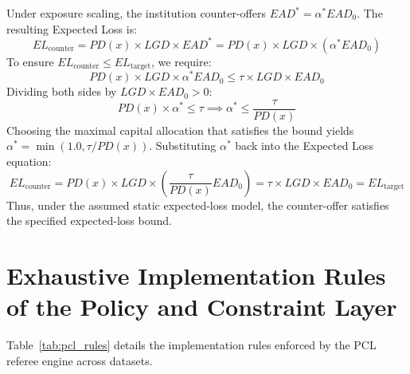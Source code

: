 \documentclass[manuscript,screen,review,anonymous]{acmart}
\begin{document}
Under exposure scaling, the institution counter-offers $EAD^* = \alpha^* EAD_0$. The resulting Expected Loss is:
\begin{equation}
EL_{\text{counter}} = PD(x) \times LGD \times EAD^* = PD(x) \times LGD \times (\alpha^* EAD_0)
\end{equation}
To ensure $EL_{\text{counter}} \le EL_{\text{target}}$, we require:
\begin{equation}
PD(x) \times LGD \times \alpha^* EAD_0 \le \tau \times LGD \times EAD_0
\end{equation}
Dividing both sides by $LGD \times EAD_0 > 0$:
\begin{equation}
PD(x) \times \alpha^* \le \tau \implies \alpha^* \le \frac{\tau}{PD(x)}
\end{equation}
Choosing the maximal capital allocation that satisfies the bound yields $\alpha^* = \min(1.0, \tau / PD(x))$. Substituting $\alpha^*$ back into the Expected Loss equation:
\begin{equation}
EL_{\text{counter}} = PD(x) \times LGD \times \left( \frac{\tau}{PD(x)} EAD_0 \right) = \tau \times LGD \times EAD_0 = EL_{\text{target}}
\end{equation}
Thus, under the assumed static expected-loss model, the counter-offer satisfies the specified expected-loss bound.

\section{Exhaustive Implementation Rules of the Policy and Constraint Layer}
\label{app:pcl_rules}
Table~\ref{tab:pcl_rules} details the implementation rules enforced by the PCL referee engine across datasets.
\end{document}
